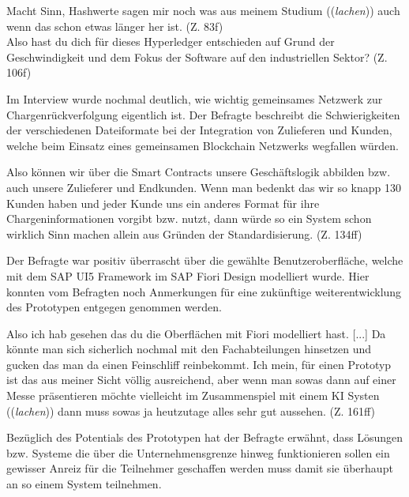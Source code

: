 \begin{displayquote}
    \glqq Macht Sinn, Hashwerte sagen mir noch was aus meinem Studium ((\textit{lachen})) auch wenn das schon etwas länger her ist.\grqq{} (Z. 83f)\\
    \glqq Also hast du dich für dieses Hyperledger entschieden auf Grund der Geschwindigkeit und dem Fokus der Software auf den industriellen Sektor?\grqq{} (Z. 106f)
\end{displayquote}

Im Interview wurde nochmal deutlich, wie wichtig gemeinsames Netzwerk zur Chargenrückverfolgung eigentlich ist. Der Befragte beschreibt die Schwierigkeiten der verschiedenen Dateiformate bei der Integration von Zulieferen und Kunden, welche beim Einsatz eines gemeinsamen Blockchain Netzwerks wegfallen würden.

\begin{displayquote}
    \glqq Also können wir über die Smart Contracts unsere Geschäftslogik abbilden bzw. auch unsere Zulieferer und Endkunden. Wenn man bedenkt das wir so knapp 130 Kunden haben und jeder Kunde uns ein anderes Format für ihre Chargeninformationen vorgibt bzw. nutzt, dann würde so ein System schon wirklich Sinn machen allein aus Gründen der Standardisierung.\grqq{} (Z. 134ff)
\end{displayquote}

Der Befragte war positiv überrascht über die gewählte Benutzeroberfläche, welche mit dem SAP UI5 Framework im SAP Fiori Design modelliert wurde. Hier konnten vom Befragten noch Anmerkungen für eine zukünftige weiterentwicklung des Prototypen entgegen genommen werden.

\begin{displayquote}
    \glqq Also ich hab gesehen das du die Oberflächen mit Fiori modelliert hast. [...] Da könnte man sich sicherlich nochmal mit den Fachabteilungen hinsetzen und gucken das man da einen Feinschliff reinbekommt. Ich mein, für einen Prototyp ist das aus meiner Sicht völlig ausreichend, aber wenn man sowas dann auf einer Messe präsentieren möchte vielleicht im Zusammenspiel mit einem KI Systen ((\textit{lachen})) dann muss sowas ja heutzutage alles sehr gut aussehen.\grqq{} (Z. 161ff)
\end{displayquote}

Bezüglich des Potentials des Prototypen hat der Befragte erwähnt, dass Lösungen bzw. Systeme die über die Unternehmensgrenze hinweg funktionieren sollen ein gewisser Anreiz für die Teilnehmer geschaffen werden muss damit sie überhaupt an so einem System teilnehmen.

